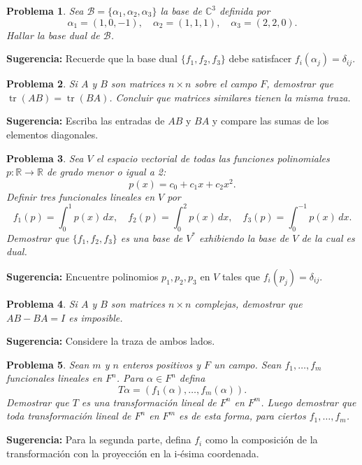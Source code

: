\documentclass[12pt,a4paper]{article}
\newtheorem{problem}{Problema}
\newenvironment{suggestion}{\par\noindent\textbf{Sugerencia: }}{}
\begin{document}
\begin{problem}
Sea $\mathcal{B}=\{\alpha_1,\alpha_2,\alpha_3\}$ la base de $\mathbb{C}^3$ definida por
\[
\alpha_1=(1,0,-1),\quad \alpha_2=(1,1,1),\quad \alpha_3=(2,2,0).
\]
Hallar la base dual de $\mathcal{B}$.
\end{problem}
\begin{suggestion}
Recuerde que la base dual $\{f_1,f_2,f_3\}$ debe satisfacer $f_i(\alpha_j)=\delta_{ij}$.
\end{suggestion}

\begin{problem}
Si $A$ y $B$ son matrices $n\times n$ sobre el campo $F$, demostrar que $\operatorname{tr}(AB)=\operatorname{tr}(BA)$. Concluir que matrices similares tienen la misma traza.
\end{problem}
\begin{suggestion}
Escriba las entradas de $AB$ y $BA$ y compare las sumas de los elementos diagonales.
\end{suggestion}

\begin{problem}
Sea $V$ el espacio vectorial de todas las funciones polinomiales $p:\mathbb{R}\to\mathbb{R}$ de grado menor o igual a 2:
\[
p(x)=c_0+c_1x+c_2x^2.
\]
Definir tres funcionales lineales en $V$ por
\[
f_1(p)=\int_0^1 p(x)\,dx,\quad f_2(p)=\int_0^2 p(x)\,dx,\quad f_3(p)=\int_0^{-1} p(x)\,dx.
\]
Demostrar que $\{f_1,f_2,f_3\}$ es una base de $V^*$ exhibiendo la base de $V$ de la cual es dual.
\end{problem}
\begin{suggestion}
Encuentre polinomios $p_1,p_2,p_3$ en $V$ tales que $f_i(p_j)=\delta_{ij}$.
\end{suggestion}

\begin{problem}
Si $A$ y $B$ son matrices $n\times n$ complejas, demostrar que $AB-BA=I$ es imposible.
\end{problem}
\begin{suggestion}
Considere la traza de ambos lados.
\end{suggestion}

\begin{problem}
Sean $m$ y $n$ enteros positivos y $F$ un campo. Sean $f_1,\dots,f_m$ funcionales lineales en $F^n$. Para $\alpha\in F^n$ defina
\[
T\alpha = (f_1(\alpha),\dots,f_m(\alpha)).
\]
Demostrar que $T$ es una transformación lineal de $F^n$ en $F^m$. Luego demostrar que toda transformación lineal de $F^n$ en $F^m$ es de esta forma, para ciertos $f_1,\dots,f_m$.
\end{problem}
\begin{suggestion}
Para la segunda parte, defina $f_i$ como la composición de la transformación con la proyección en la i-ésima coordenada.
\end{suggestion}
\end{document}
